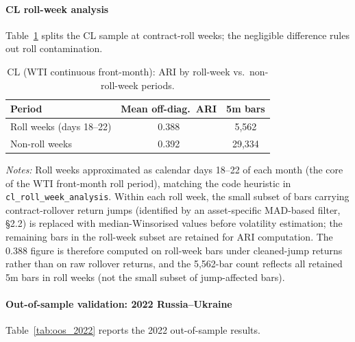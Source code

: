 \documentclass[preprint,12pt,authoryear]{elsarticle}
\begin{document}
\paragraph{CL roll-week analysis}
Table~\ref{tab:cl_roll} splits the CL sample at contract-roll weeks; the negligible difference rules out roll contamination.

\begin{table}[H]
\centering
\small
\setlength{\tabcolsep}{5pt}
\caption{CL (WTI continuous front-month): ARI by roll-week vs.\ non-roll-week periods.}
\label{tab:cl_roll}
\begin{tabular}{lcc}
\toprule
Period & Mean off-diag.\ ARI & 5m bars \\
\midrule
Roll weeks (days 18--22) & 0.388 & 5,562 \\
Non-roll weeks & 0.392 & 29,334 \\
\bottomrule
\end{tabular}
\par\medskip
{\footnotesize\justifying
\textit{Notes:} Roll weeks approximated as calendar days 18--22 of each month (the core of the WTI front-month roll period), matching the code heuristic in \texttt{cl\_roll\_week\_analysis}. Within each roll week, the small subset of bars carrying contract-rollover return jumps (identified by an asset-specific MAD-based filter, \S{}2.2) is replaced with median-Winsorised values before volatility estimation; the remaining bars in the roll-week subset are retained for ARI computation. The 0.388 figure is therefore computed on roll-week bars under cleaned-jump returns rather than on raw rollover returns, and the 5{,}562-bar count reflects all retained 5m bars in roll weeks (not the small subset of jump-affected bars).
\par}
\end{table}

\paragraph{Out-of-sample validation: 2022 Russia--Ukraine}
Table~\ref{tab:oos_2022} reports the 2022 out-of-sample results.
\end{document}
